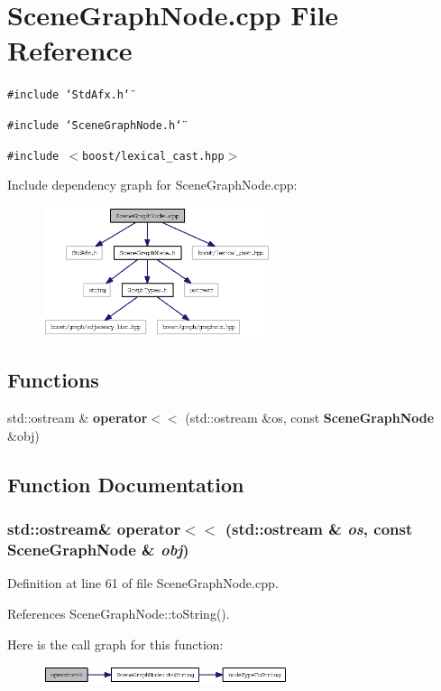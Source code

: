 \section{SceneGraphNode.cpp File Reference}
\label{SceneGraphNode_8cpp}


{\tt \#include \char`\"{}StdAfx.h\char`\"{}}\par
{\tt \#include \char`\"{}SceneGraphNode.h\char`\"{}}\par
{\tt \#include $<$boost/lexical\_\-cast.hpp$>$}\par


Include dependency graph for SceneGraphNode.cpp:\nopagebreak
\begin{figure}[H]
\begin{center}
\leavevmode
\includegraphics[width=189pt]{SceneGraphNode_8cpp__incl}
\end{center}
\end{figure}
\subsection*{Functions}
\begin{CompactItemize}
\item 
std::ostream \& {\bf operator$<$$<$} (std::ostream \&os, const {\bf SceneGraphNode} \&obj)
\end{CompactItemize}


\subsection{Function Documentation}
\subsubsection{\setlength{\rightskip}{0pt plus 5cm}std::ostream\& operator$<$$<$ (std::ostream \& {\em os}, const {\bf SceneGraphNode} \& {\em obj})}\label{SceneGraphNode_8cpp_afdd9566f57fdc8aa45f89687105c795}




Definition at line 61 of file SceneGraphNode.cpp.

References SceneGraphNode::toString().

Here is the call graph for this function:\nopagebreak
\begin{figure}[H]
\begin{center}
\leavevmode
\includegraphics[width=203pt]{SceneGraphNode_8cpp_afdd9566f57fdc8aa45f89687105c795_cgraph}
\end{center}
\end{figure}
